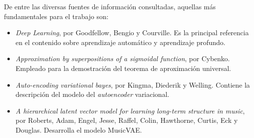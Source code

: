De entre las diversas fuentes de información consultadas, aquellas más fundamentales para el trabajo son:

\begin{itemize}
  \item \textit{Deep Learning}, por Goodfellow, Bengio y Courville. Es la principal referencia en el contenido sobre aprendizaje automático y aprendizaje profundo.
  \item \textit{Approximation by superpositions of a sigmoidal function}, por Cybenko. Empleado para la demostración del teorema de aproximación universal.
  \item \textit{Auto-encoding variational bayes}, por Kingma, Diederik y Welling. Contiene la descripción del modelo del \textit{autoencoder} variacional.
  \item \textit{A hierarchical latent vector model for learning long-term structure in music}, por Roberts, Adam, Engel, Jesse, Raffel, Colin, Hawthorne, Curtis, Eck y Douglas. Desarrolla el modelo MusicVAE.
\end{itemize}

\endinput
